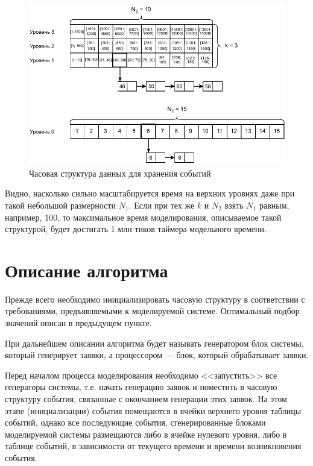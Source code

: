 \begin{figure}[h!btp]
	\centering
	\includegraphics[width=1\columnwidth]{inc/img/hybrid_structure_example.pdf}
	\caption{Часовая структура данных для хранения событий}
	\label{img:hybrid_structure_example}	
\end{figure}

Видно, насколько сильно масштабируется время на верхних уровнях даже при такой небольшой размерности $N_1$. Если при тех же $k$ и $N_2$ взять $N_1$ равным, например, 100, то максимальное время моделирования, описываемое такой структурой, будет достигать 1 млн тиков таймера модельного времени.

\section{Описание алгоритма}
Прежде всего необходимо инициализировать часовую структуру в соответствии с требованиями, предъявляемыми к моделируемой системе. Оптимальный подбор значений описан в предыдущем пункте.

При дальнейшем описании алгоритма будет называть генератором блок системы, который генерирует заявки, а процессором --- блок, который обрабатывает заявки.


Перед началом процесса моделирования необходимо <<запустить>> все генераторы системы, т.е. начать генерацию заявок и поместить в часовую структуру события, связанные с окончанием генерации этих заявок.
На этом этапе (инициализации) события помещаются в ячейки верхнего уровня таблицы событий, однако все последующие события, сгенерированные блоками моделируемой системы размещаются либо в ячейке нулевого уровня, либо в таблице событий, в зависимости от текущего времени и времени возникновения события.


